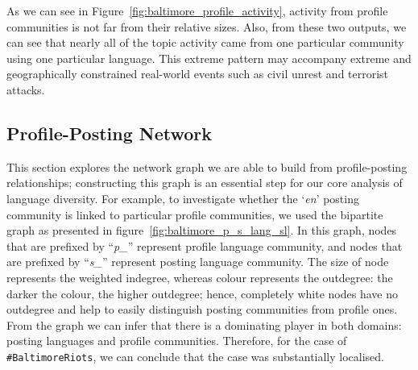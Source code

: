 As we can see in Figure~\ref{fig:baltimore_profile_activity}, activity
from profile communities is not far from their relative sizes.  Also,
from these two outputs, we can see that nearly all of the topic
activity came from one particular community using one particular
language. This extreme pattern may accompany extreme and
geographically constrained real-world events such as civil unrest and
terrorist attacks.

\subsection{Profile-Posting Network}

This section explores the network graph we are able to build from
profile-posting relationships; constructing this graph is an essential
step for our core analysis of language diversity. For example, to
investigate whether the `{\emph{en}}' posting community is linked to
particular profile communities, we used the bipartite graph as
presented in figure~\ref{fig:baltimore_p_s_lang_sl}.  In this graph,
nodes that are prefixed by ``{\emph{p\_}}'' represent profile language
community, and nodes that are prefixed by ``{\emph{s\_}}'' represent
posting language community. The size of node represents the weighted
indegree, whereas colour represents the outdegree: the darker the
colour, the higher outdegree; hence, completely white nodes have no
outdegree and help to easily distinguish posting communities from
profile ones. From the graph we can infer that there is a dominating
player in both domains: posting languages and profile communities.
Therefore, for the case of {\texttt{\#BaltimoreRiots}}, we can
conclude that the case was substantially localised.

